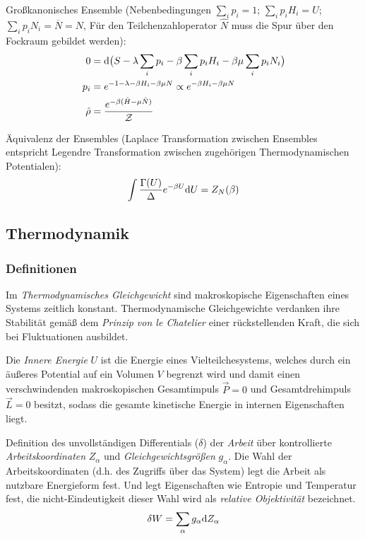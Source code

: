 			\noindent
			Großkanonisches Ensemble (Nebenbedingungen $\sum_i p_i = 1$; $\sum_i p_i H_i = U$; $\sum_i p_i N_i = \overline{N} = N$, Für den Teilchenzahloperator $\hat{N}$ muss die Spur über den Fockraum gebildet werden):
			\begin{equation}
				\begin{aligned}
					0 &= \mathrm{d} \big( S - \lambda \sum_i p_i - \beta \sum_i p_i H_i - \beta\mu \sum_i p_i N_i \big) \\
					p_i &= e^{-1-\lambda-\beta H_i-\beta\mu N} \propto e^{-\beta H_i - \beta\mu N} \\
					\hat{\rho} &= \frac{e^{-\beta (\hat{H} - \mu \hat{N})}}{\mathcal{Z}} \\
				\end{aligned}
			\end{equation}

			\noindent
			Äquivalenz der Ensembles (Laplace Transformation zwischen Ensembles entspricht Legendre Transformation zwischen zugehörigen Thermodynamischen Potentialen):
			\begin{equation}
				\int \frac{\Gamma(U)}{\Delta} e^{-\beta U} \mathrm{d} U = Z_N(\beta)
			\end{equation}


	\subsection{Thermodynamik}
		\subsubsection{Definitionen}
			Im \emph{Thermodynamisches Gleichgewicht} sind makroskopische Eigenschaften eines Systems zeitlich konstant. Thermodynamische Gleichgewichte verdanken ihre Stabilität gemäß dem \emph{Prinzip von le Chatelier} einer rückstellenden Kraft, die sich bei Fluktuationen ausbildet. \vsp

			Die \emph{Innere Energie} $U$ ist die Energie eines Vielteilchesystems, welches durch ein äußeres Potential auf ein Volumen $V$ begrenzt wird und damit einen verschwindenden makroskopischen Gesamtimpuls $\vec{P}=0$ und Gesamtdrehimpuls $\vec{L} = 0$ besitzt, sodass die gesamte kinetische Energie in internen Eigenschaften liegt. \vsp

			Definition des unvollständigen Differentials ($\delta$) der \emph{Arbeit} über kontrollierte \emph{Arbeitskoordinaten} $Z_\alpha$ und \emph{Gleichgewichtsgrößen} $g_\alpha$. Die Wahl der Arbeitskoordinaten (d.h. des Zugriffs über das System) legt die Arbeit als nutzbare Energieform fest. Und legt Eigenschaften wie Entropie und Temperatur fest, die nicht-Eindeutigkeit dieser Wahl wird als \emph{relative Objektivität} bezeichnet.
			\begin{equation}
				\delta W = \sum_\alpha g_\alpha \mathrm{d} Z_\alpha
			\end{equation} \vsp

